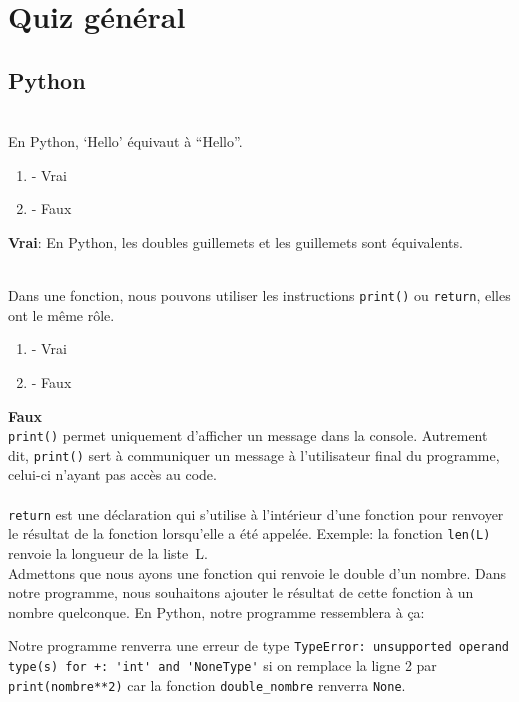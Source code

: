 \section{Quiz général}

\subsection{Python}

\begin{Exercice}[2 minutes]\\
En Python, `Hello' équivaut à ``Hello''. 

\begin{enumerate}
    \item - Vrai
    \item - Faux
\end{enumerate}
\begin{solution}
    \textbf{Vrai}: En Python, les doubles guillemets et les guillemets sont équivalents. 
\end{solution}
\end{Exercice}


\begin{Exercice}[2 minutes]\\
Dans une fonction, nous pouvons utiliser les instructions \lstinline{print()} ou \lstinline{return}, elles ont le même rôle.
\begin{enumerate}
    \item - Vrai
    \item - Faux
\end{enumerate}
\begin{solution}
    \textbf{Faux}\\
    \lstinline{print()} permet uniquement d'afficher un message dans la console. Autrement dit, \lstinline{print()} sert à communiquer un message à l'utilisateur final du programme, celui-ci n'ayant pas accès au code.\\\\
    \lstinline{return} est une déclaration qui s'utilise à l'intérieur d'une fonction pour renvoyer le résultat de la fonction lorsqu'elle a été appelée. Exemple: la fonction \lstinline{len(L)} renvoie la longueur de la liste~L.\\

    Admettons que nous ayons une fonction qui renvoie le double d'un nombre. Dans notre programme, nous souhaitons ajouter le résultat de cette fonction à un nombre quelconque.
    En Python, notre programme ressemblera à ça:
    

    Notre programme renverra une erreur de type \lstinline{TypeError: unsupported operand type(s) for +: 'int' and 'NoneType'} si on remplace la ligne 2 par \lstinline{print(nombre**2)} car la fonction \lstinline{double_nombre} renverra \lstinline{None}.
\end{solution}
\end{Exercice}


